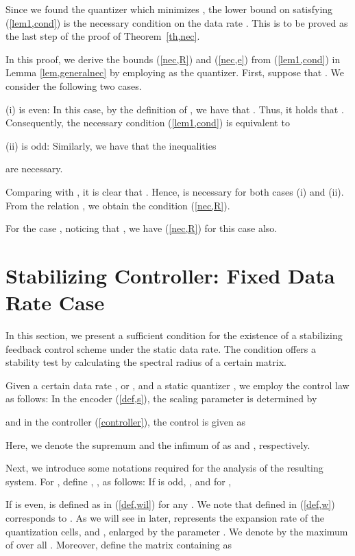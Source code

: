 \documentclass[a4paper, 11pt]{article}
\makeatletter
\theoremstyle{definition}
\newenvironment{pf}[1][\proofname]{\par\pushQED{\qed}
 \normalfont\topsep6\p@\@plus6\p@\relax\trivlist\item[\hskip\labelsep\bfseries#1\@addpunct{.}]
 \ignorespaces}{\popQED\endtrivlist\@endpefalse}
\makeatother
\begin{document}
Since we found the quantizer which minimizes , the lower bound
on  satisfying (\ref{lem1,cond}) is the necessary condition on the data
rate  .
This is to be proved as the last step of the proof of Theorem~\ref{th,nec}.

\begin{pf}[Proof of Theorem~\ref{th,nec}]
 In this proof, we derive the bounds (\ref{nec,R}) and (\ref{nec,e}) from
(\ref{lem1,cond}) in Lemma \ref{lem,generalnec} by employing  as
the quantizer.
First, suppose that .
We consider the following two cases.

(i)  is even: In this case, by the definition of , we have
that . Thus, it holds that
.
Consequently, the necessary condition (\ref{lem1,cond}) is equivalent to 


(ii)  is odd:
Similarly, we have that the inequalities

are necessary.

Comparing  with , it is clear that .
Hence,  is necessary for both cases (i) and (ii).
From the relation , we obtain the condition (\ref{nec,R}).

For the case , noticing that ,
we have (\ref{nec,R}) for this case also.
\end{pf}


\section{Stabilizing Controller: Fixed Data Rate Case}\label{sec,suf}
In this section, we present a sufficient condition for the existence of
a stabilizing feedback control scheme under the static data rate.
The condition offers a stability test by calculating the spectral radius
of a certain matrix.

Given a certain data rate , or , and a static quantizer ,
we employ the control law as follows: In the encoder (\ref{def,s}), the
scaling parameter is determined by

and in the controller (\ref{controller}), the control is given as

Here, we denote the supremum and the infimum of  as
 and , respectively.


Next, we introduce some notations required for the analysis of the resulting system.
For , define , ,
as follows:
If  is odd, , and for ,

If  is even,  is defined as in (\ref{def,wil}) for any .
We note that  defined in (\ref{def,w}) corresponds to .
As we will see in later,  represents the expansion rate of the
quantization cells,  and , enlarged
by the parameter .
We denote by  the maximum of  over all .
Moreover, define the matrix  containing  as
\end{document}
